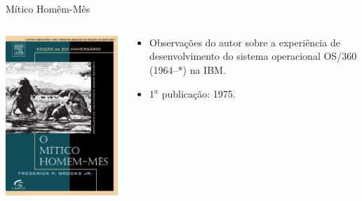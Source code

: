 

\lecturetitle{\course}{\insertlecture}

\section*{\insertlecture}

\frame{\maketitle}

\begin{frame}{Mítico Homêm-Mês}
\footnotesize
  \begin{columns}
    \begin{column}{.4\textwidth}
      \includegraphics[scale=.35]{img/mitico.png}
    \end{column}
    \begin{column}{.6\textwidth}
      \begin{itemize}
      \item Observações do autor sobre a experiência de desenvolvimento 
        do sistema operacional OS/360 (1964--*) na IBM.
      \item 1$^a$ publicação: 1975.
      \end{itemize}
    \end{column}

  \end{columns}
  
\end{frame}


